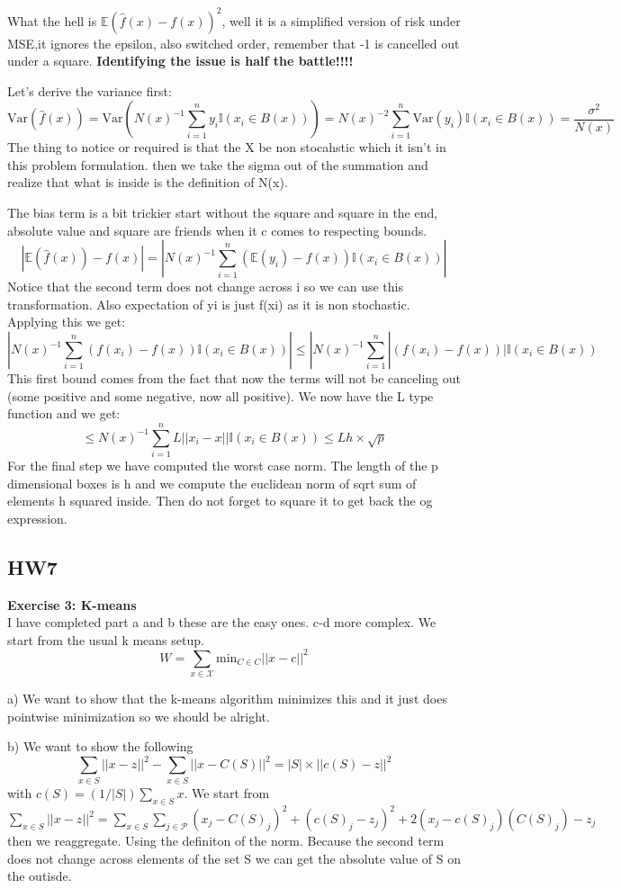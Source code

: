 \documentclass{article}
\begin{document}
What the hell is $\mathbb{E}(\hat{f}(x)-f(x))^2$, well it is a simplified version of risk under MSE,it ignores the epsilon, also switched order, remember that -1 is cancelled out 
under a square. \textbf{Identifying the issue is half the battle!!!!} 

Let's derive the variance first:
$$\text{Var}(\hat{f}(x)) = \text{Var}(N(x)^{-1}\sum_{i=1}^{n}y_i\mathbb{I}(x_i \in B(x)))
= N(x)^{-2}\sum_{i=1}^{n}\text{Var}(y_i)\mathbb{I}(x_i \in B(x)) = \frac{\sigma^2}{N(x)}
$$
The thing to notice or required is that the X be non stocahstic which it isn't in this problem formulation. 
then we take the sigma out of the summation and realize that what is inside is the definition of N(x). 

The bias term is a bit trickier start without the square and square in the end, absolute value and square are friends when it c
comes to respecting bounds.
$$|\mathbb{E}(\hat{f}(x)) -f(x)| = |N(x)^{-1}\sum_{i=1}^{n}(\mathbb{E}(y_i) -f(x))\mathbb{I}(x_i \in B(x)) |$$
Notice that the second term does not change across i so we can use this transformation. Also expectation of yi is just f(xi) as it is non stochastic.
Applying this we get:
$$|N(x)^{-1}\sum_{i=1}^{n}(f(x_i) -f(x))\mathbb{I}(x_i \in B(x)) | \leq |N(x)^{-1}\sum_{i=1}^{n}|(f(x_i) -f(x))|\mathbb{I}(x_i \in B(x)) $$
This first bound comes from the fact that now the terms will not be canceling out (some positive and some negative, now all positive). 
We now have the L type function and we get: 
$$\leq N(x)^{-1}\sum_{i=1}^{n}L||x_i - x||\mathbb{I}(x_i \in B(x))  \leq L h \times \sqrt{p}$$
For the final step we have computed the worst case norm. The length of the p dimensional boxes is h and we compute the euclidean norm of sqrt sum of elements h squared inside.
Then do not forget to square it to get back the og expression.

\subsection*{HW7}

\textbf{Exercise 3: K-means}\\
I have completed part a and b these are the easy ones. c-d more complex. 
We start from the usual k means setup. $$W = \sum_{x \in \mathcal{X}} \text{min}_{C \in C}||x-c||^2$$

a) We want to show that the k-means algorithm minimizes this and it just does pointwise minimization so we should be alright. 

b) We want to show the following 
$$
\sum_{x \in S}||x - z||^2 - \sum_{x \in S}||x - C(S)||^2 = |S|\times||c(S)-z||^2
$$ 
with $c(S) = (1/|S|)\sum_{x \in S}x$.
We start from $\sum_{x \in S}||x - z||^2 = \sum_{x \in S}\sum_{j \in \mathcal{P} }(x_j-C(S)_j)^2 + (c(S)_j-z_j)^2 + 2(x_j - c(S)_j)(C(S)_j) -z_j$
then we reaggregate. Using the definiton of the norm. Because 
the second term does not change across elements of the set S we can get the absolute value of S on the outisde. 
\end{document}
